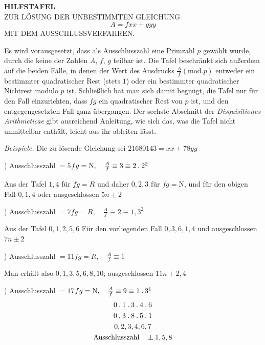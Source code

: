 \clearpage{}
\renewcommand{\BookRunningTitle}{Hilfstafel zur Lösung der unbestimmten Gleichung}
\begin{center}
\textbf{HILFSTAFEL}\\[.7em]
ZUR LÖSUNG DER UNBESTIMMTEN GLEICHUNG
\[
A=fxx+gyy
\]
MIT DEM AUSSCHLUSSVERFAHREN.
\end{center}
Es wird vorausgesetzt, dass als Ausschlusszahl eine Primzahl $p$ gewählt wurde, durch die keine der Zahlen $A$, $f$, $g$ teilbar ist. Die Tafel beschränkt sich außerdem auf die beiden Fälle, in denen der Wert des Ausdrucks $\frac{A}{f}(\mathrm{mod}.p)$ entweder ein bestimmter quadratischer Rest (stets $1$) oder ein bestimmter quadratischer Nichtrest modulo $p$ ist. Schließlich hat man sich damit begnügt, die Tafel nur für den Fall einzurichten, dass $fg$ ein quadratischer Rest von $p$ ist, und den entgegengesetzten Fall ganz übergangen. Der sechste Abschnitt der \textit{Disquisitiones Arithmeticae} gibt ausreichend Anleitung, wie sich das, was die Tafel nicht unmittelbar enthält, leicht aus ihr ableiten lässt.
\par\medskip\textit{Beispiele.} Die zu lösende Gleichung sei $21680143=xx+78yy$
\par\medskip{}) Ausschlusszahl $=5$\hfill $fg=\mathrm{N},\quad \frac{A}{f}\equiv3\equiv2\mathbin{.}2^2$
\par\noindent Aus der Tafel $1,4$ für $fg=R$ und daher $0,2,3$ für $fg=\mathrm{N}$,
und für den obigen Fall $0,1,4$ oder ausgeschlossen $5n\pm2$
\par\medskip{}) Ausschlusszahl $=7$\hfill $fg=R,\quad \frac{A}{f}\equiv2\equiv1,3^2$
\par\noindent Aus der Tafel $0,1,2,5,6$ Für den vorliegenden Fall $0,3,6,1,4$ und ausgeschlossen $7n\pm2$
\par\medskip{}) Ausschlusszahl $=11$\hfill $fg=R,\quad \frac{A}{f}\equiv1$
\par\noindent Man erhält also $0,1,3,5,6,8,10$; ausgeschlossen $11n\pm2,4$
\par\medskip{}) Ausschlusszahl $=17$\hfill $fg=\mathrm{N},\quad \frac{A}{f}\equiv9\equiv1\mathbin{.}3^1$
\[
\begin{gathered}
0\mathbin{.}1\mathbin{.}3\mathbin{.}4\mathbin{.}6\\
0\mathbin{.}3\mathbin{.}8\mathbin{.}5\mathbin{.}1\\
0,2,3,4,6,7\\
\text{Ausschlusszahl}\quad\pm1,5,8
\end{gathered}
\]
